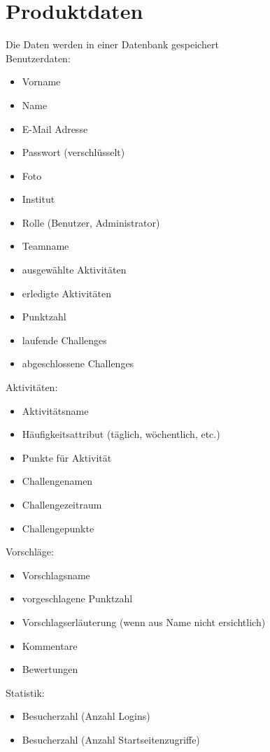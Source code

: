 \section{Produktdaten}
Die Daten werden in einer Datenbank gespeichert \\

Benutzerdaten: 
\begin{itemize}
\item Vorname
\item Name
\item E-Mail Adresse
\item Passwort (verschlüsselt)
\item Foto
\item Institut
\item Rolle (Benutzer, Administrator)
\item Teamname
\item ausgewählte Aktivitäten
\item erledigte Aktivitäten
\item Punktzahl
\item laufende Challenges
\item abgeschlossene Challenges
\end{itemize}

Aktivitäten: 
\begin{itemize}
\item Aktivitätsname
\item Häufigkeitsattribut (täglich, wöchentlich, etc.)
\item Punkte für Aktivität
\item Challengenamen
\item Challengezeitraum
\item Challengepunkte
\end{itemize}

Vorschläge:
\begin{itemize}
\item Vorschlagsname
\item vorgeschlagene Punktzahl
\item Vorschlagserläuterung (wenn aus Name nicht ersichtlich)
\item Kommentare
\item Bewertungen
\end{itemize}

Statistik:
\begin{itemize}
\item Besucherzahl (Anzahl Logins)
\item Besucherzahl (Anzahl Startseitenzugriffe)
\end{itemize}





